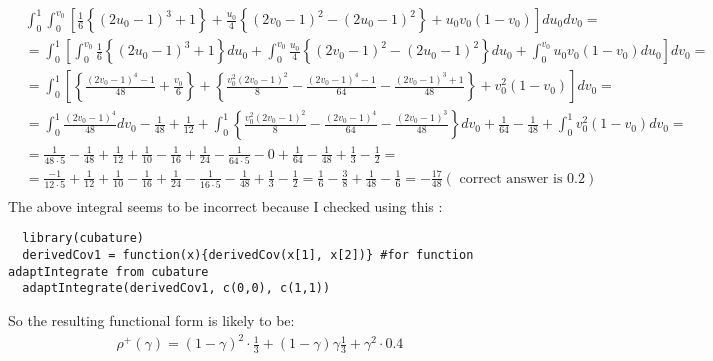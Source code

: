 \documentclass[]{article}
\begin{document}
	$$
	\begin{aligned}
    &\int_0^1 \int_0^{v_0}  \left[    \frac{1}{6}\left\{  (2u_0 - 1)^3 +1\right\} +  \frac{u_0}{4}\left\{  (2v_0 - 1)^2 -(2u_0 - 1)^2 \right\} + u_0 v_0 (1 - v_0)   \right] du_0  dv_0 = \\
    &= \int_0^1 \left[ \int_0^{v_0}      \frac{1}{6}\left\{  (2u_0 - 1)^3 +1\right\}du_0   +  \int_0^{v_0} \frac{u_0}{4}\left\{  (2v_0 - 1)^2 -(2u_0 - 1)^2 \right\} du_0  + \int_0^{v_0} u_0 v_0 (1 - v_0)  du_0  \right]  dv_0 = \\
    &= \int_0^1 \left[    \left\{ \frac{(2v_0 - 1)^4 - 1}{48}  + \frac{v_0}{6} \right\}   +      \left\{   \frac{v_0^2(2v_0 - 1)^2}{8}     -\frac{(2v_0 - 1)^4 - 1}{64} - \frac{(2v_0 - 1)^3 + 1}{48}     \right\}   + v_0^2 (1 - v_0)    \right]  dv_0 = \\
    &= \int_0^1   \frac{(2v_0 - 1)^4}{48} dv_0 - \frac{1}{48}  + \frac{1}{12}     +      \int_0^1    \left\{   \frac{v_0^2(2v_0 - 1)^2}{8}     -\frac{(2v_0 - 1)^4}{64} - \frac{(2v_0 - 1)^3}{48}     \right\}dv_0  + \frac{1}{64} -  \frac{1}{48}  + \int_0^1 v_0^2 (1 - v_0)    dv_0=\\
    &=  \frac{1}{48 \cdot 5}- \frac{1}{48}  + \frac{1}{12}     +     \frac{1}{10}  - \frac{1}{16} + \frac{1}{24}         -\frac{1}{64\cdot 5} - 0       + \frac{1}{64} -  \frac{1}{48}  + \frac{1}{3} - \frac{1}{2}=\\
    &=  \frac{-1}{12 \cdot 5}  + \frac{1}{12}     +     \frac{1}{10}  - \frac{1}{16} + \frac{1}{24}         -\frac{1}{16\cdot 5}  -  \frac{1}{48}  + \frac{1}{3} - \frac{1}{2}  =   \frac{1}{6}  - \frac{3}{8} + \frac{1}{48}  - \frac{1}{6} = -\frac{17}{48} (\text{ correct answer is } 0.2)\\
  \end{aligned}
	$$
The above integral seems to be incorrect because I checked using this :

{\tiny
{\begin{verbatim}
  library(cubature)
  derivedCov1 = function(x){derivedCov(x[1], x[2])} #for function adaptIntegrate from cubature
  adaptIntegrate(derivedCov1, c(0,0), c(1,1))
\end{verbatim}
}}

So the resulting functional form is likely to be:
	$$
	\begin{aligned}
    \rho^+(\gamma) = (1-\gamma)^2\cdot \frac{1}{3} + (1-\gamma)\gamma \frac{1}{3} +\gamma^2 \cdot 0.4
	\end{aligned}
	$$
~\\
\end{document}
